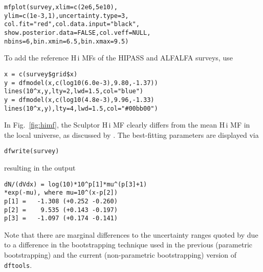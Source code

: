 \documentclass[a4paper,fleqn,usenatbib]{mnras}
\newcommand{\dftools}{\texttt{dftools}\xspace}
\newcommand{\fig}[1]{Fig.~\ref{fig:#1}}
\newcommand{\ha}{H{\sc\,i}\xspace}
\begin{document}
{\color{blue}\begin{lstlisting}
mfplot(survey,xlim=c(2e6,5e10),
ylim=c(1e-3,1),uncertainty.type=3,
col.fit="red",col.data.input="black",
show.posterior.data=FALSE,col.veff=NULL,
nbins=6,bin.xmin=6.5,bin.xmax=9.5)
\end{lstlisting}}
%   
\noindent To add the reference \ha MFs of the HIPASS \citep{Zwaan2005} and ALFALFA \citep{Martin2010} surveys, use
%
{\color{blue}\begin{lstlisting}
x = c(survey$grid$x)
y = dfmodel(x,c(log10(6.0e-3),9.80,-1.37))
lines(10^x,y,lty=2,lwd=1.5,col="blue")
y = dfmodel(x,c(log10(4.8e-3),9.96,-1.33)
lines(10^x,y),lty=4,lwd=1.5,col="#00bb00")
\end{lstlisting}}
%
\noindent In \fig{himf}, the Sculptor \ha MF clearly differs from the mean \ha MF in the local universe, as discussed by \cite{Westmeier2017}. The best-fitting parameters are displayed via
%
{\color{blue}\begin{lstlisting}
dfwrite(survey)
\end{lstlisting}}
%
\noindent resulting in the output
%
{\color{blue}\begin{lstlisting}
dN/(dVdx) = log(10)*10^p[1]*mu^(p[3]+1)
*exp(-mu), where mu=10^(x-p[2])
p[1] =   -1.308 (+0.252 -0.260)
p[2] =    9.535 (+0.143 -0.197)
p[3] =   -1.097 (+0.174 -0.141)
\end{lstlisting}}
%
\noindent Note that there are marginal differences to the uncertainty ranges quoted by \cite{Westmeier2017} due to a difference in the bootstrapping technique used in the previous (parametric bootstrapping) and the current (non-parametric bootstrapping) version of \dftools.

\bsp	%
\label{lastpage}
\end{document}
